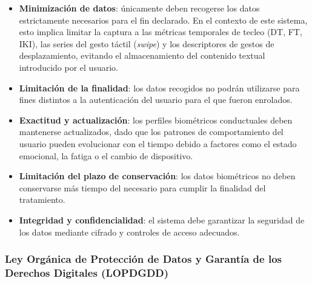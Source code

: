 \begin{itemize}
    \item \textbf{Minimización de datos}: únicamente deben recogerse 
    los datos estrictamente necesarios para el fin declarado. En el 
    contexto de este sistema, esto implica limitar la captura a las 
    métricas temporales de tecleo (DT, FT, IKI), las series del gesto táctil
    (\textit{swipe}) y los descriptores de gestos de desplazamiento, 
    evitando el almacenamiento del contenido textual 
    introducido por el usuario.

    \item \textbf{Limitación de la finalidad}: los datos recogidos no 
    podrán utilizarse para fines distintos a la autenticación del 
    usuario para el que fueron enrolados.

    \item \textbf{Exactitud y actualización}: los perfiles biométricos 
    conductuales deben mantenerse actualizados, dado que los patrones 
    de comportamiento del usuario pueden evolucionar con el tiempo 
    debido a factores como el estado emocional, la fatiga o el cambio 
    de dispositivo.

    \item \textbf{Limitación del plazo de conservación}: los datos 
    biométricos no deben conservarse más tiempo del necesario para 
    cumplir la finalidad del tratamiento.

    \item \textbf{Integridad y confidencialidad}: el sistema debe 
    garantizar la seguridad de los datos mediante cifrado y controles 
    de acceso adecuados.
\end{itemize}

\subsubsection{Ley Orgánica de Protección de Datos y Garantía de los 
Derechos Digitales (LOPDGDD)}

